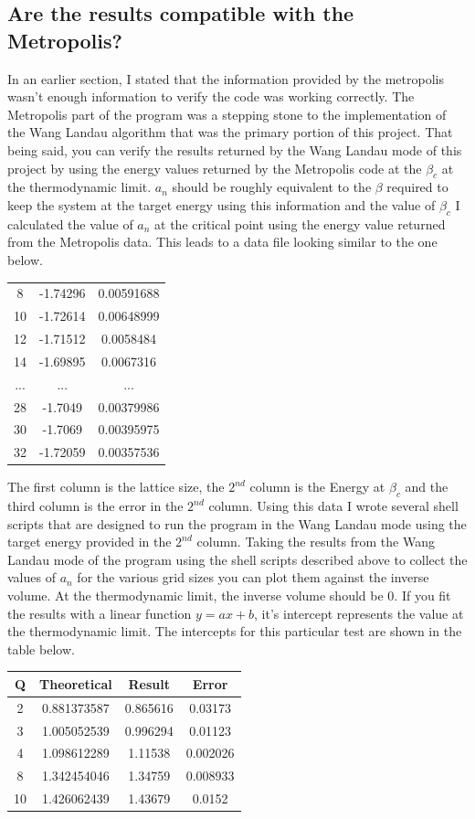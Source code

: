 \subsection{Are the results compatible with the Metropolis?}
In an earlier section, I stated that the information provided by the metropolis wasn't enough information to verify the code was working correctly.
The Metropolis part of the program was a stepping stone to the implementation of the Wang Landau algorithm that was the primary portion of this project.
That being said, you can verify the results returned by the Wang Landau mode of this project by using the energy values returned by the Metropolis code at the $\beta_c$ at the thermodynamic limit. 
$a_n$ should be roughly equivalent to the $\beta$ required to keep the system at the target energy using this information and the value of $\beta_c$ I calculated the value of $a_n$ at the critical point using the energy value returned from the Metropolis data.
This leads to a data file looking similar to the one below.
\begin{table}[H]
\centering
\begin{tabular}{ccc}
8  & -1.74296 & 0.00591688 \\
10 & -1.72614 & 0.00648999 \\
12 & -1.71512 & 0.0058484  \\
14 & -1.69895 & 0.0067316  \\
...	& ...	& ...	\\
28 & -1.7049  & 0.00379986 \\
30 & -1.7069  & 0.00395975 \\
32 & -1.72059 & 0.00357536
\end{tabular}
\end{table}
The first column is the lattice size, the $2^{nd}$ column is the Energy at $\beta_c$ and the third column is the error in the $2^{nd}$ column.
Using this data I wrote several shell scripts that are designed to run the program in the Wang Landau mode using the target energy provided in the $2^{nd}$ column.
Taking the results from the Wang Landau mode of the program using the shell scripts described above to collect the values of $a_n$ for the various grid sizes you can plot them against the inverse volume.
At the thermodynamic limit, the inverse volume should be 0. If you fit the results with a linear function $y=ax+b$, it's intercept represents the value at the thermodynamic limit.
The intercepts for this particular test are shown in the table below.
\begin{table}[H]
\centering
\begin{tabular}{|c|c|c|c|}
\hline
Q  & Theoretical & Result   & Error    \\ \hline
2  & 0.881373587 & 0.865616 & 0.03173  \\ \hline
3  & 1.005052539 & 0.996294 & 0.01123  \\ \hline
4  & 1.098612289 & 1.11538  & 0.002026 \\ \hline
8  & 1.342454046 & 1.34759  & 0.008933 \\ \hline
10 & 1.426062439 & 1.43679  & 0.0152   \\ \hline
\end{tabular}
\end{table}

